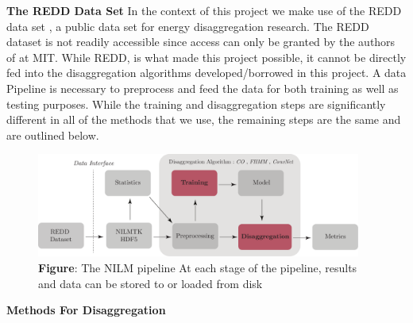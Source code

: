 \documentclass[landscape,fontscale=0.48,margin=2cm,paperwidth=135truecm,paperheight=89truecm]{baposter}
\begin{document}
\begin{poster}
\begin{posterbox}[column=0,below=auto,height=bottom]{\LARGE \bfseries The REDD Data Set}
In the context of this project we make use of the REDD data set \cite{REDD}, a public data set for energy disaggregation research. The REDD dataset is not readily accessible since access can only be granted by the authors of \cite{REDD} at MIT. While REDD, is what made this project possible, it cannot be directly fed into the disaggregation algorithms developed/borrowed in this project. A data Pipeline is necessary to preprocess and feed the data for both training as well as testing purposes. While the training and disaggregation steps are significantly different in all of the methods that we use, the remaining steps are the same and are outlined below.
\begin{figure}
\begin{center}
\includegraphics[width=0.95\textwidth]{NILM_Data_Pipeline}
\caption*{\footnotesize  \textbf{Figure}: The NILM pipeline At each stage of the pipeline, results and data can be stored to or loaded from disk} \vspace*{-1 cm}
\end{center}
\end{figure}
\end{posterbox}



%
\begin{posterbox}[column=1, height = bottom]{\LARGE \bfseries Methods For Disaggregation}
\vspace{1em}


\end{posterbox}
\end{poster}
\end{document}
